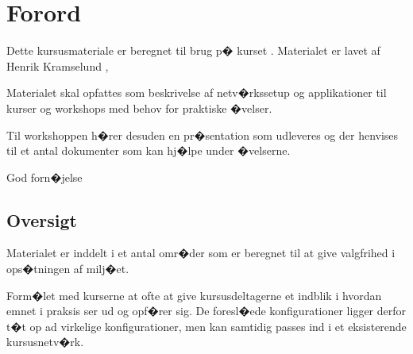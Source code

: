 \documentclass[a4paper,11pt,notitlepage]{oevelser}
\begin{document}

\newcommand{\emne}[1]{Netv�rkssikkerhed i firmanetv�rk}
\newcommand{\kursus}[1]{\emne{} workshop}
\newcommand{\kursusnavn}[1]{\emne\\ �velsesh�fte}



\thispagestyle{empty}
\eject

\setlength{\parskip}{0pt}

\setcounter{tocdepth}{0}

\normal

{\color{titlecolor}\tableofcontents}

\normal
\pagestyle{fancyplain}
\chapter*{\color{titlecolor}Forord}
Dette kursusmateriale er beregnet til brug p� kurset
\emph{\kursus}. Materialet er lavet af Henrik Kramselund  , 

Materialet skal opfattes som beskrivelse af netv�rkssetup og
applikationer til kurser og workshops med behov for praktiske
�velser.

Til workshoppen h�rer desuden en pr�sentation som udleveres og der
henvises til et antal dokumenter som kan hj�lpe under �velserne.

\vskip 1cm
God forn�jelse

\section*{\color{titlecolor}Oversigt}
\setlength{\parskip}{10pt}

Materialet er inddelt i et antal omr�der som er beregnet til at give
valgfrihed i ops�tningen af milj�et.

Form�let med kurserne at ofte at give kursusdeltagerne et indblik i
hvordan emnet i praksis ser ud og opf�rer sig. De foresl�ede
konfigurationer ligger derfor t�t op ad virkelige konfigurationer, men
kan samtidig passes ind i et eksisterende kursusnetv�rk.


\end{document}
